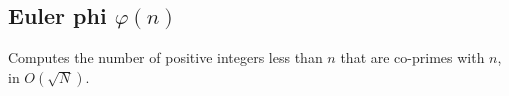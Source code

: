 \subsection{Euler phi $\varphi(n)$}

Computes the number of positive integers less than $n$ that are co-primes with $n$, in $O(\sqrt{N})$.

